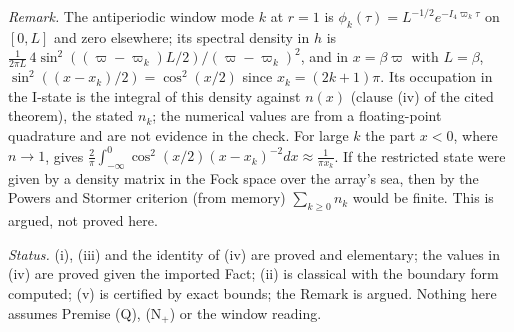 \emph{Remark.} The antiperiodic window mode $k$ at $r = 1$ is $\phi_{k}(\tau) = L^{-1/2}e^{-I_4\varpi_{k}\tau}$ on $[0, L]$ and zero elsewhere; its spectral density in $h$ is $\tfrac{1}{2\pi L}\,4\sin^{2}((\varpi - \varpi_{k})L/2)/(\varpi - \varpi_{k})^{2}$, and in $x = \beta\varpi$ with $L = \beta$, $\sin^{2}((x - x_{k})/2) = \cos^{2}(x/2)$ since $x_{k} = (2k + 1)\pi$. Its occupation in the I-state is the integral of this density against $n(x)$ (clause (iv) of the cited theorem), the stated $n_{k}$; the numerical values are from a floating-point quadrature and are not evidence in the check. For large $k$ the part $x < 0$, where $n \to 1$, gives $\tfrac{2}{\pi}\int_{-\infty}^{0}\cos^{2}(x/2)(x - x_{k})^{-2}dx \approx \tfrac{1}{\pi x_{k}}$. If the restricted state were given by a density matrix in the Fock space over the array's sea, then by the Powers and Stormer criterion (from memory) $\sum_{k \ge 0}n_{k}$ would be finite. This is argued, not proved here.

\emph{Status.} (i), (iii) and the identity of (iv) are proved and elementary; the values in (iv) are proved given the imported Fact; (ii) is classical with the boundary form computed; (v) is certified by exact bounds; the Remark is argued. Nothing here assumes Premise (Q), (N$_{+}$) or the window reading.
